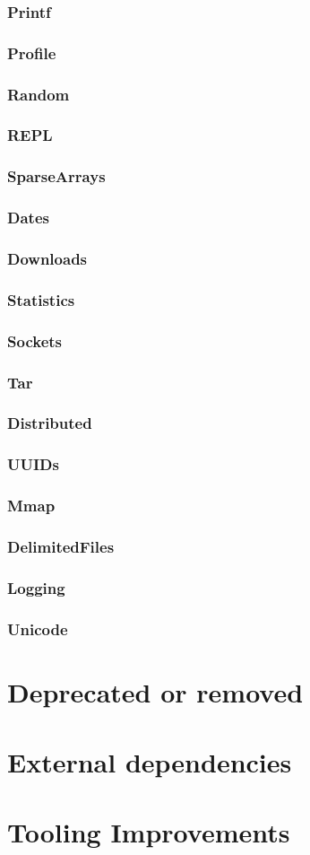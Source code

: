     \subsection{Printf}
    \subsection{Profile}
    \subsection{Random}
    \subsection{REPL}
    \subsection{SparseArrays}
    \subsection{Dates}
    \subsection{Downloads}
    \subsection{Statistics}
    \subsection{Sockets}
    \subsection{Tar}
    \subsection{Distributed}
    \subsection{UUIDs}
    \subsection{Mmap}
    \subsection{DelimitedFiles}
    \subsection{Logging}
    \subsection{Unicode}
  \chapter{Deprecated or removed}
  \chapter{External dependencies}
  \chapter{Tooling Improvements}
